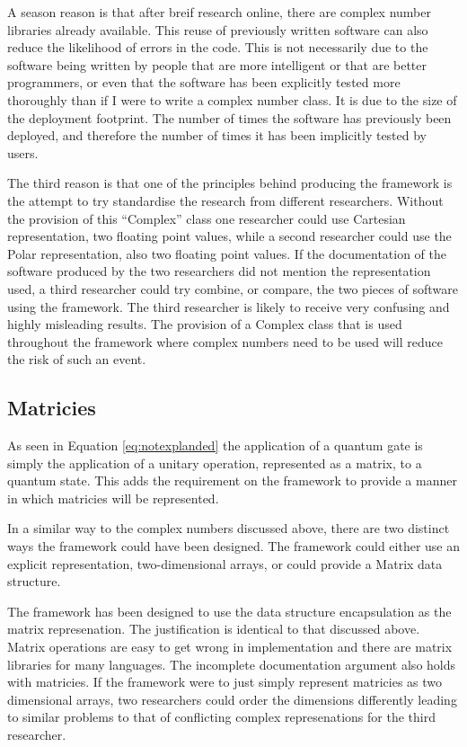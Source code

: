 \documentclass[authoryearcitations]{UoYCSproject}
\begin{document}
A season reason is that after breif research online, there are complex number libraries already available.
This reuse of previously written software can also reduce the likelihood of errors in the code.
This is not necessarily due to the software being written by people that are more intelligent or that are better programmers, or even that the software has been explicitly tested more thoroughly than if I were to write a complex number class.
It is due to the size of the deployment footprint.
The number of times the software has previously been deployed, and therefore the number of times it has been implicitly tested by users.

The third reason is that one of the principles behind producing the framework is the attempt to try standardise the research from different researchers.
Without the provision of this ``Complex'' class one researcher could use Cartesian representation, two floating point values, while a second researcher could use the Polar representation, also two floating point values.
If the documentation of the software produced by the two researchers did not mention the representation used, a third researcher could try combine, or compare, the two pieces of software using the framework.
The third researcher is likely to receive very confusing and highly misleading results.
The provision of a Complex class that is used throughout the framework where complex numbers need to be used will reduce the risk of such an event.

\subsection{Matricies}
As seen in Equation \ref{eq:notexplanded} the application of a quantum gate is simply the application of a unitary operation, represented as a matrix, to a quantum state.
This adds the requirement on the framework to provide a manner in which matricies will be represented.

In a similar way to the complex numbers discussed above, there are two distinct ways the framework could have been designed.
The framework could either use an explicit representation, two-dimensional arrays, or could provide a Matrix data structure.

The framework has been designed to use the data structure encapsulation as the matrix represenation.
The justification is identical to that discussed above.
Matrix operations are easy to get wrong in implementation and there are matrix libraries for many languages.
The incomplete documentation argument also holds with matricies.
If the framework were to just simply represent matricies as two dimensional arrays, two researchers could order the dimensions differently leading to similar problems to that of conflicting complex represenations for the third researcher.
\end{document}
